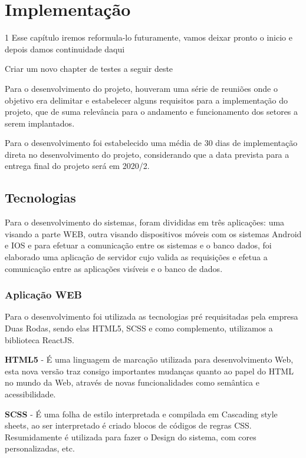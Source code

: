 \chapter{Implementação}

{\color{red} 1 Esse capítulo iremos reformula-lo futuramente, vamos deixar pronto o inicio e depois damos continuidade daqui}

{\color{red} Criar um novo chapter de testes a seguir deste}




Para o desenvolvimento do projeto, houveram uma série de reuniões onde o objetivo era delimitar e estabelecer alguns requisitos para a implementação do projeto, que de suma relevância para o andamento e funcionamento dos setores a serem implantados.

Para o desenvolvimento foi estabelecido uma média de 30 dias de implementação direta no desenvolvimento do projeto, considerando que a data prevista para a entrega final do projeto será em 2020/2.

\section{Tecnologias}
Para o desenvolvimento do sistemas, foram divididas em três aplicações: uma visando a parte WEB, outra visando dispositivos móveis com os sistemas Android e IOS e para efetuar a comunicação entre os sistemas e o banco dados, foi elaborado uma aplicação de servidor cujo valida as requisições e efetua a comunicação entre as aplicações visíveis e o banco de dados.

\subsection{Aplicação WEB}

Para o desenvolvimento foi utilizada as tecnologias pré requisitadas pela empresa Duas Rodas, sendo elas HTML5, SCSS e como complemento, utilizamos a biblioteca ReactJS.



{\textbf{HTML5} - É uma linguagem de marcação utilizada para desenvolvimento Web, esta nova versão traz consigo importantes mudanças quanto ao papel do HTML no mundo da Web, através de novas funcionalidades como semântica e acessibilidade.}

{\textbf{SCSS} - É uma folha de estilo interpretada e compilada em Cascading style sheets, ao ser interpretado é criado blocos de códigos de regras CSS. Resumidamente é utilizada para fazer o Design do sistema, com cores personalizadas, etc.}

